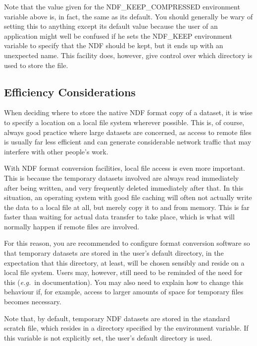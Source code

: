 \documentclass[11pt,twoside,nolof]{starlink}
\providecommand{\st}[1]{{\em{#1}}}
\begin{document}
Note that the value given for the NDF\_KEEP\_COMPRESSED environment
variable above is, in fact, the same as its default.  You should
generally be wary of setting this to anything except its default value
because the user of an application might well be confused if he sets
the NDF\_KEEP environment variable to specify that the NDF should be
kept, but it ends up with an unexpected name. This facility does,
however, give control over which directory is used to store the file.

\subsection{Efficiency Considerations}

When deciding where to store the native NDF format copy of a dataset,
it is wise to specify a location on a local file system wherever
possible. This is, of course, always good practice where large
datasets are concerned, as access to remote files is usually far less
efficient and can generate considerable network traffic that may
interfere with other people's work.

With NDF format conversion facilities, local file access is even more
important. This is because the temporary datasets involved are always
read immediately after being written, and very frequently deleted
immediately after that. In this situation, an operating system with
good file caching will often not actually write the data to a local
file at all, but merely copy it to and from memory. This is far faster
than waiting for actual data transfer to take place, which is what
will normally happen if remote files are involved.

For this reason, you are recommended to configure format conversion
software so that temporary datasets are stored in the user's default
directory, in the expectation that this directory, at least, will be
chosen sensibly and reside on a local file system. Users may, however,
still need to be reminded of the need for this (\st{e.g.}\ in
documentation). You may also need to explain how to change this
behaviour if, for example, access to larger amounts of space for
temporary files becomes necessary.

Note that, by default, temporary NDF datasets are stored in the
standard  scratch file, which resides in a
directory specified by the 
environment variable. If this variable is not explicitly set, the
user's default directory is used.
\end{document}
